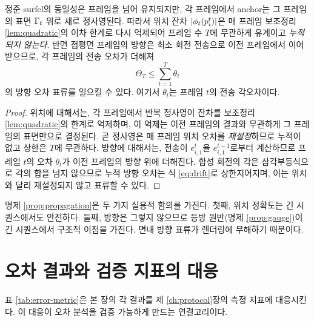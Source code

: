\begin{proposition}
\label{prop:propagation}
정준 surfel의 동일성은 프레임을 넘어 유지되지만, 각 프레임에서 anchor는 그 프레임의
표면 $\Gamma_t$ 위로 새로 정사영된다. 따라서 위치 잔차 $\left\lvert \phi_t(p^t_i) \right\rvert$은 매
프레임 보조정리 \ref{lem:quadratic}의 이차 한계로 다시 억제되어 프레임 수 $T$에
무관하게 유계이고 \emph{누적되지 않는다}. 반면 접평면 프레임의 방향은 최소 회전
전송으로 이전 프레임에서 이어받으므로, 각 프레임의 전송 오차가 더해져
\begin{equation}
  \Theta_T \le \sum_{t=1}^{T}\theta_t
  \label{eq:drift}
\end{equation}
의 방향 오차 표류를 일으킬 수 있다. 여기서 $\theta_t$는 프레임 $t$의 전송 각오차이다.
\end{proposition}

\begin{proof}
위치에 대해서는, 각 프레임에서 반복 정사영이 잔차를 보조정리 \ref{lem:quadratic}의
한계로 억제하며, 이 억제는 이전 프레임의 결과와 무관하게 그 프레임의 표면만으로
결정된다. 곧 정사영은 매 프레임 위치 오차를 \emph{재설정}하므로 누적이 없고 상한은
$T$에 무관하다. 방향에 대해서는, 전송이 $e^t_{i,1}$을 $e^{t-1}_{i,1}$로부터 계산하므로
프레임 $t$의 오차 $\theta_t$가 이전 프레임의 방향 위에 더해진다. 합성 회전의 각은
삼각부등식으로 각의 합을 넘지 않으므로 누적 방향 오차는 식 \eqref{eq:drift}로
상한지어지며, 이는 위치와 달리 재설정되지 않고 표류할 수 있다.
\end{proof}

명제 \ref{prop:propagation}은 두 가지 실용적 함의를 가진다. 첫째, 위치 정확도는 긴
시퀀스에서도 안전하다. 둘째, 방향은 그렇지 않으므로 등방 원반(명제 \ref{prop:gauge})이
긴 시퀀스에서 구조적 이점을 가진다. 면내 방향 표류가 렌더링에 무해하기 때문이다.

\section{오차 결과와 검증 지표의 대응}
\label{sec:error-to-metric}

표 \ref{tab:error-metric}은 본 장의 각 결과를 제 \ref{ch:protocol}장의 측정 지표에
대응시킨다. 이 대응이 오차 분석을 검증 가능하게 만드는 연결고리이다.

